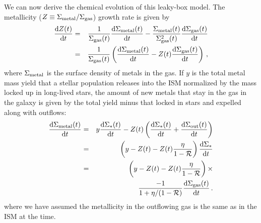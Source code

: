 \documentclass[12pt, appendixfloats, numberedappendix]{emulateapj}
\begin{document}
We can now derive the chemical evolution of this leaky-box model.
The metallicity ($Z\equiv\Sigma_{\rm metal}/\Sigma_{\rm gas}$) growth rate is given by
\begin{eqnarray}
\frac{{\rm d} Z(t)}{{\rm d} t} & = & \frac{1}{\Sigma_{\rm gas}(t)}\frac{{\rm d} \Sigma_{\rm metal}(t)}{{\rm d} t} - 
\frac{\Sigma_{\rm metal}(t)}{\Sigma_{\rm gas}^2(t)}\frac{{\rm d} \Sigma_{\rm gas}(t)}{{\rm d} t} \nonumber \\
 & = & \frac{1}{\Sigma_{\rm gas}(t)} \left( \frac{{\rm d} \Sigma_{\rm metal}(t)}{{\rm d} t} - Z(t)\frac{{\rm d} \Sigma_{\rm gas}(t)}{{\rm d} t} \right) \,\mathrm{,}
 \label{eq:metalgrowth}
\end{eqnarray}
\noindent where $\Sigma_{\rm metal}$ is the surface density of metals in the gas.
If $y$ is the total metal mass yield that a stellar population releases into the ISM normalized 
by the mass locked up in long-lived stars,
the amount of new metals that stay in the gas in the galaxy is given by the total yield minus that locked in stars 
and expelled along with outflows:
\begin{eqnarray}
\frac{{\rm d} \Sigma_{\rm metal}(t)}{{\rm d} t} & = & y \frac{{\rm d} \Sigma_{*}(t)}{{\rm d} t} - Z(t) \left(\frac{{\rm d} \Sigma_{*}(t)}{{\rm d} t} + \frac{{\rm d} \Sigma_{\rm out}(t)}{{\rm d} t}\right) \nonumber \\
 & = & \left(y-Z(t)-Z(t)\frac{\eta}{1-\mathcal{R}}\right) \frac{{\rm d} \Sigma_*}{{\rm d} t} \nonumber \\
 & = & \left(y-Z(t)-Z(t)\frac{\eta}{1-\mathcal{R}}\right) \times \nonumber \\
 &   & \frac{-1}{1+\eta/(1-\mathcal{R})}\frac{{\rm d} \Sigma_{\rm gas}(t)}{{\rm d} t}\,\mathrm{.}
\end{eqnarray}
\noindent where we have assumed the metallicity in the outflowing gas is the same as in the ISM at the time.
\end{document}

